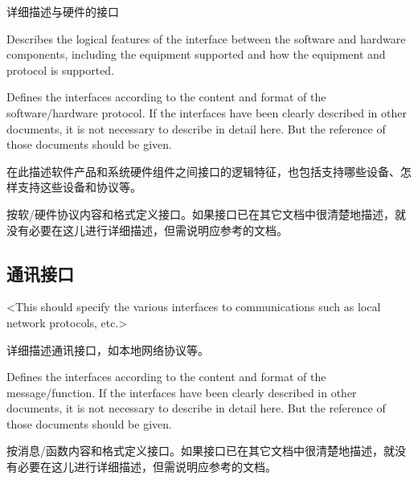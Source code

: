 详细描述与硬件的接口

Describes the logical features of the interface between the software and hardware components, including the equipment supported and how the equipment and protocol is supported. 

Defines the interfaces according to the content and format of the software/hardware protocol. If the interfaces have been clearly described in other documents, it is not necessary to describe in detail here. But the reference of those documents should be given.

在此描述软件产品和系统硬件组件之间接口的逻辑特征，也包括支持哪些设备、怎样支持这些设备和协议等。
 
按软/硬件协议内容和格式定义接口。如果接口已在其它文档中很清楚地描述，就没有必要在这儿进行详细描述，但需说明应参考的文档。

\subsection{通讯接口}
<This should specify the various interfaces to communications such as local network protocols, etc.>

详细描述通讯接口，如本地网络协议等。

Defines the interfaces according to the content and format of the message/function. If the interfaces have been clearly described in other documents, it is not necessary to describe in detail here. But the reference of those documents should be given.

按消息/函数内容和格式定义接口。如果接口已在其它文档中很清楚地描述，就没有必要在这儿进行详细描述，但需说明应参考的文档。
